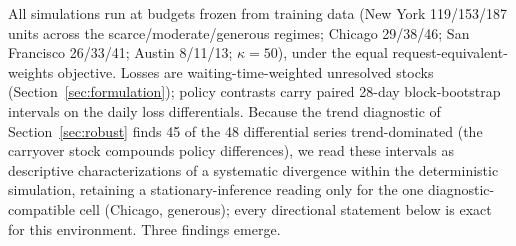 All simulations run at budgets frozen from training data (New York
119/153/187 units across the scarce/moderate/generous regimes; Chicago
29/38/46; San Francisco 26/33/41; Austin 8/11/13; $\kappa=50$), under
the equal request-equivalent-weights objective. Losses are waiting-time-weighted
unresolved stocks (Section~\ref{sec:formulation}); policy contrasts carry paired 28-day
block-bootstrap intervals on the daily loss differentials. Because the
trend diagnostic of Section~\ref{sec:robust} finds 45 of the 48 differential
series trend-dominated (the carryover stock compounds policy
differences), we read these intervals as descriptive characterizations of
a systematic divergence within the deterministic simulation, retaining a
stationary-inference reading only for the one diagnostic-compatible cell
(Chicago, generous); every directional statement below is exact for this
environment. Three findings emerge.

